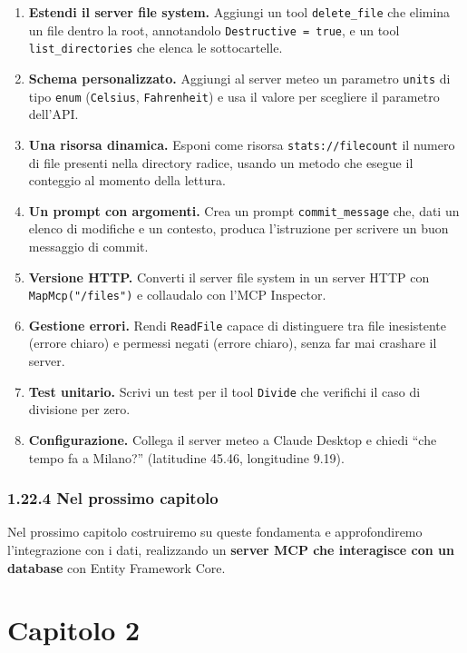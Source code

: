 \documentclass[
  italian,
  10pt,
]{book}
\providecommand{\tightlist}{%
  \setlength{\itemsep}{0pt}\setlength{\parskip}{0pt}}
\begin{document}
\begin{enumerate}
\def\labelenumi{\arabic{enumi}.}
\tightlist
\item
  \textbf{Estendi il server file system.} Aggiungi un tool
  \texttt{delete\_file} che elimina un file dentro la root, annotandolo
  \texttt{Destructive\ =\ true}, e un tool \texttt{list\_directories}
  che elenca le sottocartelle.
\item
  \textbf{Schema personalizzato.} Aggiungi al server meteo un parametro
  \texttt{units} di tipo \texttt{enum} (\texttt{Celsius},
  \texttt{Fahrenheit}) e usa il valore per scegliere il parametro
  dell'API.
\item
  \textbf{Una risorsa dinamica.} Esponi come risorsa
  \texttt{stats://filecount} il numero di file presenti nella directory
  radice, usando un metodo che esegue il conteggio al momento della
  lettura.
\item
  \textbf{Un prompt con argomenti.} Crea un prompt
  \texttt{commit\_message} che, dati un elenco di modifiche e un
  contesto, produca l'istruzione per scrivere un buon messaggio di
  commit.
\item
  \textbf{Versione HTTP.} Converti il server file system in un server
  HTTP con \texttt{MapMcp("/files")} e collaudalo con l'MCP Inspector.
\item
  \textbf{Gestione errori.} Rendi \texttt{ReadFile} capace di
  distinguere tra file inesistente (errore chiaro) e permessi negati
  (errore chiaro), senza far mai crashare il server.
\item
  \textbf{Test unitario.} Scrivi un test per il tool \texttt{Divide} che
  verifichi il caso di divisione per zero.
\item
  \textbf{Configurazione.} Collega il server meteo a Claude Desktop e
  chiedi ``che tempo fa a Milano?'' (latitudine 45.46, longitudine
  9.19).
\end{enumerate}

\subsection{1.22.4 Nel prossimo capitolo}\label{nel-prossimo-capitolo}

Nel prossimo capitolo costruiremo su queste fondamenta e approfondiremo
l'integrazione con i dati, realizzando un \textbf{server MCP che
interagisce con un database} con Entity Framework Core.

\chapter{Capitolo 2}\label{capitolo-2}
\end{document}
